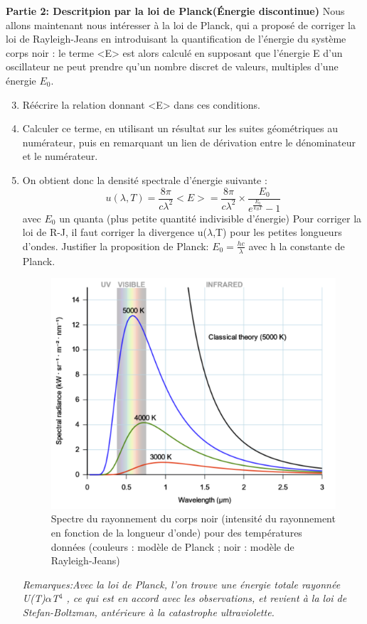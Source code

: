 \documentclass{article}
\begin{document}
\newpage
\textbf{Partie 2: Descritpion par la loi de Planck(Énergie discontinue)}\newline
Nous allons maintenant nous intéresser à la loi de Planck, qui a proposé de corriger la loi de Rayleigh-Jeans en introduisant la quantification de l’énergie du système corps noir : le terme <E> est alors calculé en supposant que l’énergie E d’un oscillateur ne peut prendre qu’un nombre discret de valeurs, multiples d’une énergie $E_{0}$.
\begin{enumerate}
    \setcounter{enumi}{2}
    \item Réécrire la relation donnant <E> dans ces conditions.
    \item Calculer ce terme, en utilisant un résultat sur les suites géométriques au numérateur, puis en remarquant un lien de dérivation entre le dénominateur et le numérateur.
    \item On obtient donc la densité spectrale d'énergie suivante :
\[ u(\lambda,T) = \frac{8\pi}{c\lambda^{2}}<E> = \frac{8\pi}{c\lambda^{2}} \times \frac{E_{0}}{e^{\frac{E_{0}}{k_{B}T}}-1} \] avec $E_{0}$ un quanta (plus petite quantité indivisible d'énergie)\newline
Pour corriger la loi de R-J, il faut corriger la divergence u($\lambda$,T) pour les petites longueurs d'ondes.\newline
Justifier la proposition de Planck: $E_{0} = \frac{hc}{\lambda}$ avec h la constante de Planck.\newline
\begin{figure}[h]
    \centering
    \includegraphics[scale=0.7]{catastrophe_ultraviolette.png}
    \caption{Spectre du rayonnement du corps noir (intensité du rayonnement en fonction de la longueur d’onde) pour des températures données (couleurs : modèle de Planck ; noir : modèle de Rayleigh-Jeans)}
\end{figure}

\indent\textit{Remarques:}\textit{Avec la loi de Planck, l’on trouve une énergie totale rayonnée U(T)$\alpha$T$^{4}$ , ce qui est en accord avec les observations, et revient à la loi de Stefan-Boltzman, antérieure à la catastrophe ultraviolette.}
\end{enumerate}
\end{document}
